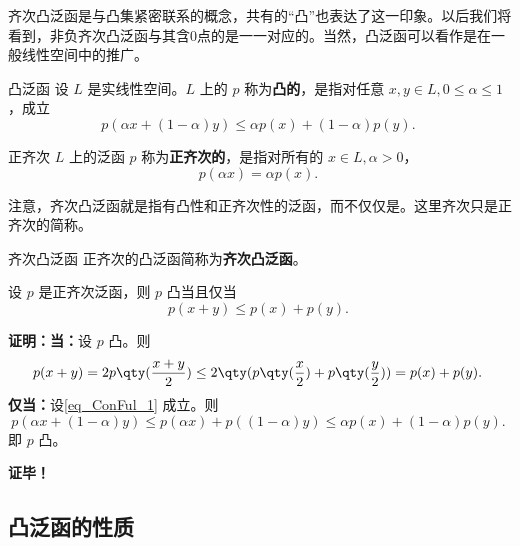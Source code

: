 
齐次凸泛函是与凸集紧密联系的概念，共有的“凸”也表达了这一印象。以后我们将看到，非负齐次凸泛函与其含0点的是一一对应的。当然，凸泛函可以看作是在一般线性空间中的推广。

\begin{definition}{凸泛函}
设 $L$ 是实线性空间。$L$ 上的 $p$ 称为\textbf{凸的}，是指对任意 $x,y\in L,0\leq\alpha\leq1$，成立
\begin{equation}
p(\alpha x+(1-\alpha)y)\leq \alpha p(x)+(1-\alpha)p(y).~
\end{equation}
\end{definition}

\begin{definition}{正齐次}
$L$ 上的泛函 $p$ 称为\textbf{正齐次的}，是指对所有的 $x\in L,\alpha >0$，
\begin{equation}
p(\alpha x)=\alpha p(x).~
\end{equation}
\end{definition}
注意，齐次凸泛函就是指有凸性和正齐次性的泛函，而不仅仅是。这里齐次只是正齐次的简称。
\begin{definition}{齐次凸泛函}
正齐次的凸泛函简称为\textbf{齐次凸泛函}。
\end{definition}

\begin{theorem}{}\label{the_ConFul_1}
设 $p$ 是正齐次泛函，则 $p$ 凸当且仅当 
\begin{equation}\label{eq_ConFul_1}
p(x+y)\leq p(x)+p(y).~
\end{equation}
\end{theorem}

\textbf{证明：}\textbf{当：}设 $p$ 凸。则
\begin{equation}
p(x+y)=2p\qty(\frac{x+y}{2})\leq 2\qty(p\qty(\frac{x}{2})+p\qty(\frac{y}{2}))=p(x)+p(y).~
\end{equation}
\textbf{仅当：}设\autoref{eq_ConFul_1} 成立。则
\begin{equation}
p(\alpha x+(1-\alpha)y)\leq p(\alpha x)+p((1-\alpha)y)\leq \alpha p(x)+(1-\alpha)p(y).~
\end{equation}
即 $p$ 凸。

\textbf{证毕！}

\subsection{凸泛函的性质}

